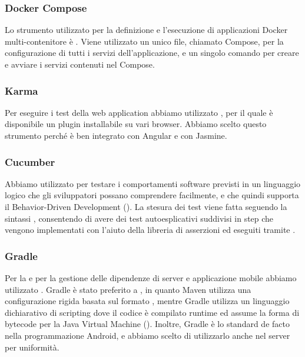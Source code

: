 \documentclass[../../manuale-manutentore.tex]{subfiles}
\begin{document}
\subsubsection{Docker Compose}%
\label{subs:docker_compose}

Lo strumento utilizzato per la definizione e l'esecuzione di applicazioni Docker multi-contenitore è .
Viene utilizzato un unico file, chiamato Compose, per la configurazione di tutti i servizi dell'applicazione, e un singolo comando per creare e avviare i servizi contenuti nel Compose.



\subsubsection{Karma}%
\label{subs:karma}

Per eseguire i test della web application abbiamo utilizzato , per il quale è disponibile un plugin installabile su vari browser.
Abbiamo scelto questo strumento perché è ben integrato con Angular e con Jasmine.

\subsubsection{Cucumber}%
\label{subs:cucumber}

Abbiamo utilizzato  per testare i comportamenti software previsti in un linguaggio logico che gli sviluppatori possano comprendere facilmente, e che quindi supporta il Behavior-Driven Development ().
La stesura dei test viene fatta seguendo la sintassi , consentendo di avere dei test autoesplicativi suddivisi in step che vengono implementati con l'aiuto della libreria di asserzioni  ed eseguiti tramite .

\subsubsection{Gradle}%
\label{subs:gradle}

Per la  e per la gestione delle dipendenze di server e applicazione mobile abbiamo utilizzato .
Gradle è stato preferito a , in quanto Maven utilizza una configurazione rigida basata sul formato , mentre Gradle utilizza un linguaggio dichiarativo di scripting  dove il codice è compilato runtime ed assume la forma di bytecode per la Java Virtual Machine ().
Inoltre, Gradle è lo standard de facto nella programmazione Android, e abbiamo scelto di utilizzarlo anche nel server per uniformità.
\end{document}
